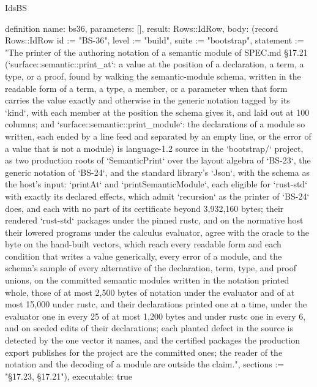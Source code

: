 \begin{lexlean}{IdsBS}
\begin{semanticmodule}
definition{
  name: bs36,
  parameters: [],
  result: Rows::IdRow,
  body: (record Rows::IdRow {id := "BS-36", level := "build", suite := "bootstrap", statement := "The printer of the authoring notation of a semantic module of SPEC.md §17.21 (`surface::semantic::print_at`: a value at the position of a declaration, a term, a type, or a proof, found by walking the semantic-module schema, written in the readable form of a term, a type, a member, or a parameter when that form carries the value exactly and otherwise in the generic notation tagged by its `kind`, with each member at the position the schema gives it, and laid out at 100 columns; and `surface::semantic::print_module`: the declarations of a module so written, each ended by a line feed and separated by an empty line, or the error of a value that is not a module) is language-1.2 source in the `bootstrap/` project, as two production roots of `SemanticPrint` over the layout algebra of `BS-23`, the generic notation of `BS-24`, and the standard library's `Json`, with the schema as the host's input: `printAt` and `printSemanticModule`, each eligible for `rust-std` with exactly its declared effects, which admit `recursion` as the printer of `BS-24` does, and each with no part of its certificate beyond 3,932,160 bytes; their rendered `rust-std` packages under the pinned rustc, and on the normative host their lowered programs under the calculus evaluator, agree with the oracle to the byte on the hand-built vectors, which reach every readable form and each condition that writes a value generically, every error of a module, and the schema's sample of every alternative of the declaration, term, type, and proof unions, on the committed semantic modules written in the notation printed whole, those of at most 2,500 bytes of notation under the evaluator and of at most 15,000 under rustc, and their declarations printed one at a time, under the evaluator one in every 25 of at most 1,200 bytes and under rustc one in every 6, and on seeded edits of their declarations; each planted defect in the source is detected by the one vector it names, and the certified packages the production export publishes for the project are the committed ones; the reader of the notation and the decoding of a module are outside the claim.", sections := "§17.23, §17.21"}),
  executable: true
}


\end{semanticmodule}
\end{lexlean}
